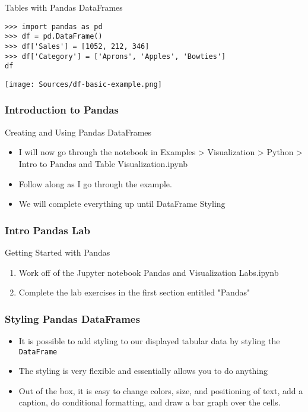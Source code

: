 \documentclass[handout, 11pt]{beamer}
\begin{document}
\begin{section}[Pandas]{Tables with Pandas DataFrames}
\begin{frame}[fragile]
\begin{verbatim}
>>> import pandas as pd
>>> df = pd.DataFrame()
>>> df['Sales'] = [1052, 212, 346]
>>> df['Category'] = ['Aprons', 'Apples', 'Bowties']
df

\end{verbatim}
\texttt{[image: Sources/df-basic-example.png]}
\end{frame}
\begin{frame}
\frametitle{Introduction to Pandas}
{
\begin{block}{Creating and Using Pandas DataFrames}
\begin{itemize}
\item I will now go through the notebook in Examples > Visualization > Python > Intro to Pandas and Table Visualization.ipynb
\item Follow along as I go through the example.
\item We will complete everything up until DataFrame Styling
\end{itemize}
\end{block}
}
\end{frame}
\begin{frame}
\frametitle{Intro Pandas Lab}
{
\begin{block}{Getting Started with Pandas}
\begin{enumerate}
\item Work off of the Jupyter notebook Pandas and Visualization Labs.ipynb
\item Complete the lab exercises in the first section entitled "Pandas"
\end{enumerate}
\vfill
\end{block}
}
\label{labs:intro-pandas-lab-1}
\end{frame}
\begin{frame}
\frametitle{Styling Pandas DataFrames}
\begin{itemize}
\item It is possible to add styling to our displayed tabular data by styling the
\texttt{DataFrame}
\vfill
\item The styling is very flexible and essentially allows you to do anything
\vfill
\item Out of the box, it is easy to change colors, size, and positioning of text, add a caption, do conditional formatting, and draw a bar graph over the cells.
\end{itemize}
\end{frame}
\begin{frame}

\end{frame}
\end{section}
\end{document}

